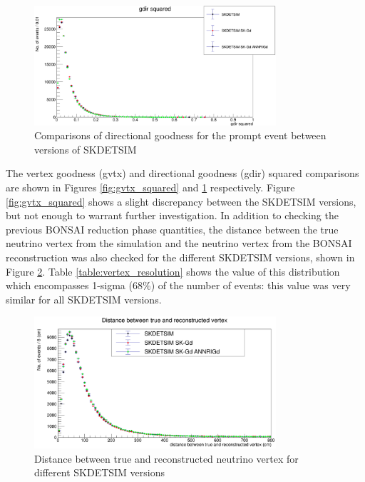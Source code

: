 \begin{figure}
    \centering
    \includegraphics[width=0.8\textwidth]{Figures/gdir_squared.PNG}
    \caption{Comparisons of directional goodness for the prompt event between versions of SKDETSIM}
    \label{fig:gdir_squared}

\end{figure}

The vertex goodness (gvtx) and directional goodness (gdir) squared comparisons are shown in Figures \ref{fig:gvtx_squared} and \ref{fig:gdir_squared} respectively. Figure \ref{fig:gvtx_squared} shows a slight discrepancy between the SKDETSIM versions, but not enough to warrant further investigation. In addition to checking the previous BONSAI reduction phase quantities, the distance between the true neutrino vertex from the simulation and the neutrino vertex from the BONSAI reconstruction was also checked for the different SKDETSIM versions, shown in Figure \ref{fig:vertex_resolution}. Table \ref{table:vertex_resolution} shows the value of this distribution which encompasses 1-sigma (68\%) of the number of events: this value was very similar for all SKDETSIM versions.
\begin{figure}

    \includegraphics[width=0.8\textwidth]{Figures/vertex_resolution.png}
    \caption{Distance between true and reconstructed neutrino vertex for different SKDETSIM versions}
    \label{fig:vertex_resolution}

\end{figure}


